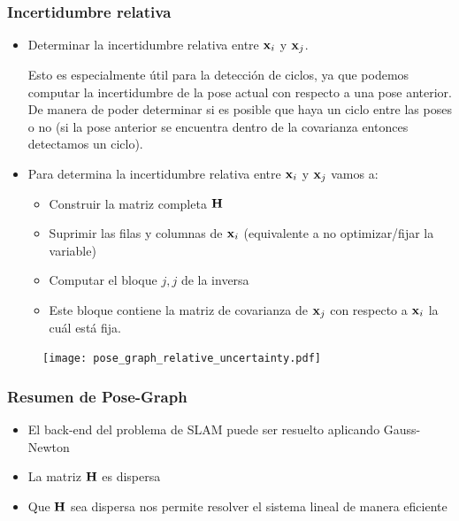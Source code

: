 \begin{frame}
    \frametitle{Incertidumbre relativa}
    \begin{itemize}
        \item Determinar la incertidumbre relativa entre $\boldsymbol{\mathbf{x}}_{i}$ y $\boldsymbol{\mathbf{x}}_{j}$.
        
        Esto es especialmente útil para la detección de ciclos, ya que podemos computar la incertidumbre de la pose actual con respecto a una pose anterior. De manera de poder determinar si es posible que haya un ciclo entre las poses o no (si la pose anterior se encuentra dentro de la covarianza entonces detectamos un ciclo).
        
        \item Para determina la incertidumbre relativa entre $\boldsymbol{\mathbf{x}}_{i}$ y $\boldsymbol{\mathbf{x}}_{j}$ vamos a:    
        \begin{itemize}
            \item Construir la matriz completa $\boldsymbol{\mathbf{H}}$
            \item Suprimir las filas y columnas de $\boldsymbol{\mathbf{x}}_{i}$ (equivalente a no optimizar/fijar la variable)
            \item Computar el bloque $j,j$ de la inversa
            \item Este bloque contiene la matriz de covarianza de $\boldsymbol{\mathbf{x}}_{j}$ con respecto a $\boldsymbol{\mathbf{x}}_{i}$ la cuál está fija.
        \end{itemize}
    \end{itemize}

    \begin{figure}[!h]
        \texttt{[image: pose\_graph\_relative\_uncertainty.pdf]}
    \end{figure}
    
\end{frame}

\begin{frame}
    \frametitle{Resumen de Pose-Graph}
    
    \begin{itemize}
        \item El back-end del problema de SLAM puede ser resuelto aplicando Gauss-Newton
        \item La matriz $\boldsymbol{\mathbf{H}}$ es dispersa
        \item Que $\boldsymbol{\mathbf{H}}$ sea dispersa nos permite resolver el sistema lineal de manera eficiente
    \end{itemize}
    
\end{frame}

